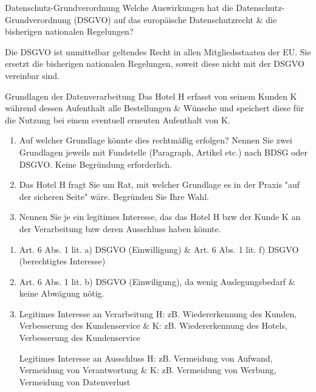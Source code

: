\documentclass{article}
\begin{document}
\begin{exercise}{Datenschutz-Grundverordnung}
  Welche Auswirkungen hat die Datenschutz-Grundverordnung (DSGVO) auf das europäische Datenschutzrecht \& die bisherigen nationalen Regelungen?

  \begin{solution}
    Die DSGVO ist unmittelbar geltendes Recht in allen Mitgliedsstaaten der EU. Sie ersetzt die bisherigen nationalen Regelungen, soweit diese nicht mit der DSGVO vereinbar sind.
  \end{solution}
\end{exercise}

\begin{exercise}{Grundlagen der Datenverarbeitung}
  Das Hotel H erfasst von seinem Kunden K während dessen Aufenthalt alle Bestellungen \& Wünsche und speichert diese für die Nutzung bei einem eventuell erneuten Aufenthalt von K.
  \begin{enumerate}
    \item Auf welcher Grundlage könnte dies rechtmäßig erfolgen? Nennen Sie zwei Grundlagen jeweils mit Fundstelle (Paragraph, Artikel etc.) nach BDSG oder DSGVO. Keine Begründung erforderlich.
    \item Das Hotel H fragt Sie um Rat, mit welcher Grundlage es in der Praxis "auf der sicheren Seite" wäre. Begründen Sie Ihre Wahl.
    \item Nennen Sie je ein legitimes Interesse, das das Hotel H bzw der Kunde K an der Verarbeitung bzw deren Ausschluss haben könnte.
  \end{enumerate}

  \begin{solution}
    \begin{enumerate}
      \item Art. 6 Abs. 1 lit. a) DSGVO (Einwilligung) \& Art. 6 Abs. 1 lit. f) DSGVO (berechtigtes Interesse)
      \item Art. 6 Abs. 1 lit. b) DSGVO (Einwiligung), da wenig Auslegungsbedarf \& keine Abwägung nötig.
      \item
            Legitimes Interesse an Verarbeitung H: zB. Wiedererkennung des Kunden, Verbesserung des Kundenservice \& K: zB. Wiedererkennung des Hotels, Verbesserung des Kundenservice\par
            Legitimes Interesse an Ausschluss H: zB. Vermeidung von Aufwand, Vermeidung von Verantwortung \& K: zB. Vermeidung von Werbung, Vermeidung von Datenverlust
    \end{enumerate}
  \end{solution}
\end{exercise}
\end{document}
